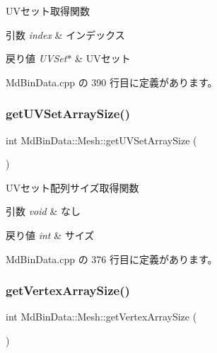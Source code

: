 U\+Vセット取得関数 


\begin{DoxyParams}{引数}
{\em index} & インデックス \\
\hline
\end{DoxyParams}

\begin{DoxyRetVals}{戻り値}
{\em U\+V\+Set$\ast$} & U\+Vセット \\
\hline
\end{DoxyRetVals}


 Md\+Bin\+Data.\+cpp の 390 行目に定義があります。

\mbox{\label{class_md_bin_data_1_1_mesh_a37ce7e36969111ee324fa6c96a4aa8ca}} 
\subsubsection{\texorpdfstring{get\+U\+V\+Set\+Array\+Size()}{getUVSetArraySize()}}
{\footnotesize\ttfamily int Md\+Bin\+Data\+::\+Mesh\+::get\+U\+V\+Set\+Array\+Size (\begin{DoxyParamCaption}{ }\end{DoxyParamCaption})}



U\+Vセット配列サイズ取得関数 


\begin{DoxyParams}{引数}
{\em void} & なし \\
\hline
\end{DoxyParams}

\begin{DoxyRetVals}{戻り値}
{\em int} & サイズ \\
\hline
\end{DoxyRetVals}


 Md\+Bin\+Data.\+cpp の 376 行目に定義があります。

\mbox{\label{class_md_bin_data_1_1_mesh_a9eb87c80b55731f3b7e9e75be3d57e66}} 
\subsubsection{\texorpdfstring{get\+Vertex\+Array\+Size()}{getVertexArraySize()}}
{\footnotesize\ttfamily int Md\+Bin\+Data\+::\+Mesh\+::get\+Vertex\+Array\+Size (\begin{DoxyParamCaption}{ }\end{DoxyParamCaption})}



